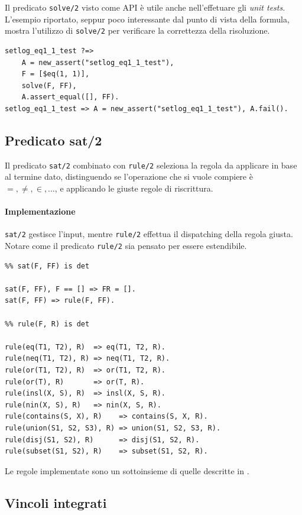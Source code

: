 \documentclass[12pt,a4paper,openright]{book} %
\begin{document}
Il predicato \verb|solve/2| visto come API è utile anche
nell'effetuare gli \emph{unit tests}. L'esempio riportato, seppur poco
interessante dal punto di vista della formula, mostra l'utilizzo di
\verb|solve/2| per verificare la correttezza della risoluzione.
\begin{verbatim}
setlog_eq1_1_test ?=>
    A = new_assert("setlog_eq1_1_test"),
    F = [$eq(1, 1)],
    solve(F, FF),
    A.assert_equal([], FF).
setlog_eq1_1_test => A = new_assert("setlog_eq1_1_test"), A.fail().
\end{verbatim}

\subsection{Predicato sat/2}
\label{subsec:lsetpicat_solver_sat2}

Il predicato \verb|sat/2| combinato con \verb|rule/2| seleziona la
regola da applicare in base al termine dato, distinguendo se
l'operazione che si vuole compiere è $=, \neq, \in, \ldots$, e
applicando le giuste regole di riscrittura.

\paragraph{Implementazione}
\verb|sat/2| gestisce l'input, mentre \verb|rule/2| effettua il
dispatching della regola giusta. Notare come il predicato
\verb|rule/2| sia pensato per essere estendibile.
\begin{verbatim}
%% sat(F, FF) is det

sat(F, FF), F == [] => FR = [].
sat(F, FF) => rule(F, FF).

%% rule(F, R) is det

rule(eq(T1, T2), R)  => eq(T1, T2, R).
rule(neq(T1, T2), R) => neq(T1, T2, R).
rule(or(T1, T2), R)  => or(T1, T2, R).
rule(or(T), R)       => or(T, R).
rule(insl(X, S), R)  => insl(X, S, R).
rule(nin(X, S), R)   => nin(X, S, R).
rule(contains(S, X), R)    => contains(S, X, R).
rule(union(S1, S2, S3), R) => union(S1, S2, S3, R).
rule(disj(S1, S2), R)      => disj(S1, S2, R).
rule(subset(S1, S2), R)    => subset(S1, S2, R).
\end{verbatim}

Le regole implementate sono un sottoinsieme di quelle descritte in
\cite{Rossi18}.

\subsection{Vincoli integrati}
\label{subsec:lsetpicat_solver_rewriterules}
\end{document}
